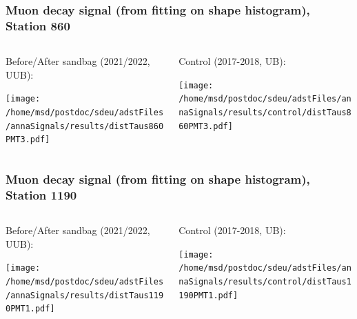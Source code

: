 \documentclass[aspectratio=169]{beamer}
\begin{document}
\begin{frame}
  \frametitle{Muon decay signal (from fitting on shape histogram), Station 860}
  
  \begin{columns}[T,c]
    \begin{column}{.5\textwidth}
      Before/After sandbag (2021/2022, UUB):
      \vspace{.3cm}

      \texttt{[image: /home/msd/postdoc/sdeu/adstFiles/annaSignals/results/distTaus860PMT3.pdf]}
    \end{column}
    \begin{column}{.5\textwidth}
      Control (2017-2018, UB):
      \vspace{0.3cm}

      \texttt{[image: /home/msd/postdoc/sdeu/adstFiles/annaSignals/results/control/distTaus860PMT3.pdf]}
    \end{column}    
\end{columns}
\end{frame}


\begin{frame}
  \frametitle{Muon decay signal (from fitting on shape histogram), Station 1190}
  
  \begin{columns}[T,c]
    \begin{column}{.5\textwidth}
      Before/After sandbag (2021/2022, UUB):
      \vspace{.3cm}

      \texttt{[image: /home/msd/postdoc/sdeu/adstFiles/annaSignals/results/distTaus1190PMT1.pdf]}
    \end{column}
    \begin{column}{.5\textwidth}
      Control (2017-2018, UB):
      \vspace{0.3cm}

      \texttt{[image: /home/msd/postdoc/sdeu/adstFiles/annaSignals/results/control/distTaus1190PMT1.pdf]}
    \end{column}
  \end{columns}
\end{frame}
\end{document}
